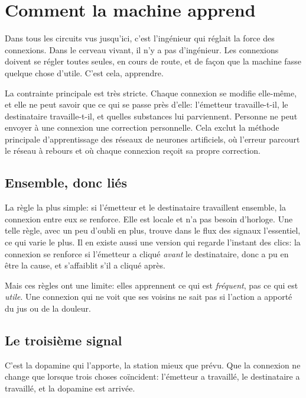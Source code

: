 \chapter{Comment la machine apprend}

Dans tous les circuits vus jusqu'ici, c'est l'ingénieur qui réglait la force des connexions. Dans le cerveau vivant, il n'y a pas d'ingénieur. Les connexions doivent se régler toutes seules, en cours de route, et de façon que la machine fasse quelque chose d'utile. C'est cela, apprendre.

La contrainte principale est très stricte. Chaque connexion se modifie elle-même, et elle ne peut savoir que ce qui se passe près d'elle: l'émetteur travaille-t-il, le destinataire travaille-t-il, et quelles substances lui parviennent. Personne ne peut envoyer à une connexion une correction personnelle. Cela exclut la méthode principale d'apprentissage des réseaux de neurones artificiels, où l'erreur parcourt le réseau à rebours et où chaque connexion reçoit sa propre correction.

\section*{Ensemble, donc liés}

La règle la plus simple: si l'émetteur et le destinataire travaillent ensemble, la connexion entre eux se renforce. Elle est locale et n'a pas besoin d'horloge. Une telle règle, avec un peu d'oubli en plus, trouve dans le flux des signaux l'essentiel, ce qui varie le plus. Il en existe aussi une version qui regarde l'instant des clics: la connexion se renforce si l'émetteur a cliqué \emph{avant} le destinataire, donc a pu en être la cause, et s'affaiblit s'il a cliqué après.

Mais ces règles ont une limite: elles apprennent ce qui est \emph{fréquent}, pas ce qui est \emph{utile}. Une connexion qui ne voit que ses voisins ne sait pas si l'action a apporté du jus ou de la douleur.

\section*{Le troisième signal}

C'est la dopamine qui l'apporte, la station \og mieux que prévu\fg{}. Que la connexion ne change que lorsque trois choses coïncident: l'émetteur a travaillé, le destinataire a travaillé, et la dopamine est arrivée.

